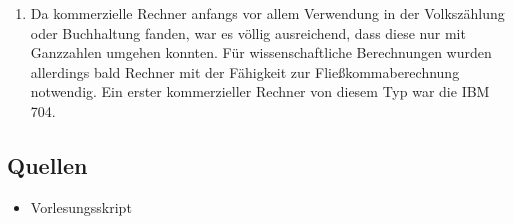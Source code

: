 \documentclass{article}
\begin{document}
\begin{enumerate}
        \item Da kommerzielle Rechner anfangs vor allem Verwendung in der Volkszählung oder Buchhaltung fanden, war es völlig ausreichend, dass diese nur mit Ganzzahlen umgehen konnten. Für wissenschaftliche Berechnungen wurden allerdings bald Rechner mit der Fähigkeit zur Fließkommaberechnung notwendig. Ein erster kommerzieller Rechner von diesem Typ war die IBM 704. 
    \end{enumerate}


    \subsection*{Quellen}
    \begin{itemize}
        \item Vorlesungsskript
    \end{itemize}
\end{document}
